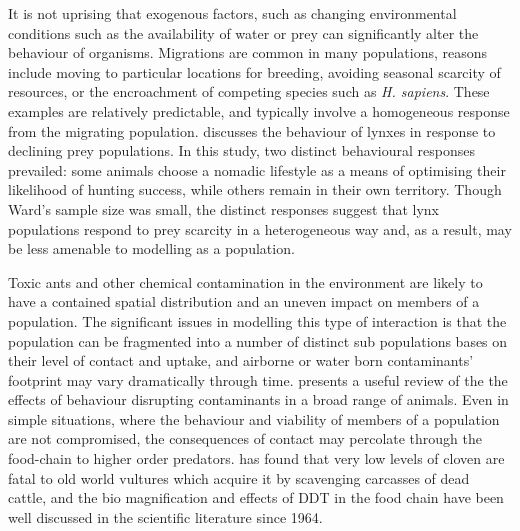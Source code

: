 It is not uprising that exogenous factors, such as changing
environ\-mental conditions such as the availability of water or prey
can significantly alter the behaviour of organisms.  Migrations are
common in many populations, reasons include moving to particular
locations for breeding, avoiding seasonal scarcity of resources, or
the encroachment of competing species such as \emph{H. sapiens}.
These examples are relatively predictable, and typically involve a
homogeneous response from the migrating population.
\Cite{ward1985behavioural} discusses the behaviour of
lynxes in response to declining prey populations. In this study, two
distinct behavioural responses prevailed: some animals choose a
nomadic lifestyle as a means of optimising their likelihood of hunting
success, while others remain in their own territory.  Though Ward's
sample size was small, the distinct responses suggest that lynx
populations respond to prey scarcity in a heterogeneous way and, as a
result, may be less amenable to modelling as a population.

Toxic ants and other chemical contamination in the environment are
likely to have a contained spatial distribution and an uneven impact
on members of a population. The significant issues in modelling this
type of interaction is that the population can be fragmented into a
number of distinct sub populations bases on their level of contact and
uptake, and airborne or water born contaminants' footprint may vary
dramatically through time. \Cite{zala2004abnormal} presents a useful
review of the the effects of behaviour disrupting contaminants in a
broad range of animals.  Even in simple situations, where the behaviour
and viability of members of a population are not compromised, the
consequences of contact may percolate through the food-chain to higher
order predators. \Cite{swan2006toxicity} has found that very low
levels of cloven are fatal to old world vultures which acquire it
by scavenging carcasses of dead cattle, and the bio magnification and
effects of DDT in the food chain have been well discussed in the
scientific literature since 1964.

